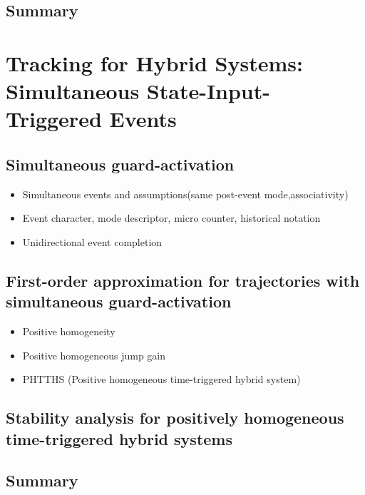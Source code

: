 \documentclass[../DC2017114Bouma.tex]{subfiles}
\begin{document}
\section{Summary}


\cleartooddpage
\chapter{Tracking for Hybrid Systems: Simultaneous State-Input-Triggered Events}\label{ch:simult}
\cite{Rijnen2018}
\section{Simultaneous guard-activation}
\begin{itemize}
\item Simultaneous events and assumptions(same post-event mode,associativity)
\item Event character, mode descriptor, micro counter, historical notation
\item Unidirectional event completion
\end{itemize}
\section{First-order approximation for trajectories with simultaneous guard-activation}
\begin{itemize}
\item Positive homogeneity
\item Positive homogeneous jump gain
\item PHTTHS (Positive homogeneous time-triggered hybrid system)
\end{itemize}

\section{Stability analysis for positively homogeneous time-triggered hybrid systems}

\section{Summary}
\end{document}
